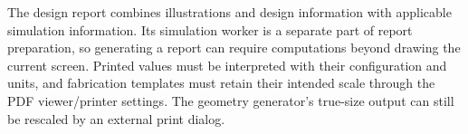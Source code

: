 The design report combines illustrations and design information with applicable simulation information. Its simulation worker is a separate part of report preparation, so generating a report can require computations beyond drawing the current screen. Printed values must be interpreted with their configuration and units, and fabrication templates must retain their intended scale through the PDF viewer/printer settings. The geometry generator's true-size output can still be rescaled by an external print dialog.

